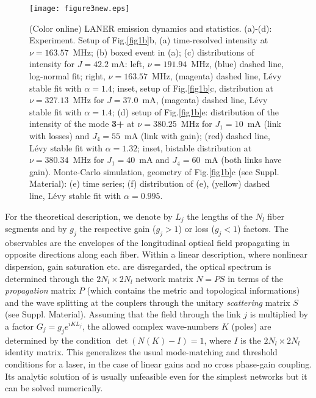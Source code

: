 \documentclass[aps,prl,twocolumn,showpacs,amsmath,amssymb,floatfix,superscriptaddress,
]{revtex4-1}
\begin{document}
\begin{figure*}
\texttt{[image: figure3new.eps]}
\caption{(Color online) LANER emission dynamics and statistics.
(a)-(d): Experiment. Setup of Fig.\ref{fig1b}b, (a) time-resolved intensity at $\nu=163.57$~MHz; (b) boxed event in (a); (c) distributions of intensity for $J=42.2$ mA: left, $\nu=191.94$~MHz, (blue) dashed line, log-normal fit; right, $\nu=163.57$~MHz, (magenta) dashed line, L\'evy stable fit with $\alpha=1.4$; inset, setup of Fig.\ref{fig1b}c, distribution at $\nu=327.13$~MHz for $J=37.0$~mA, (magenta) dashed line, L\'evy stable fit with $\alpha=1.4$; 
(d) setup of Fig.\ref{fig1b}e: distribution of the intensity of the mode {\bf 3+} at $\nu=380.25$~MHz for $J_1=10$~mA (link with losses) and $J_4=55$~mA (link with gain); (red) dashed line, L\'evy stable fit with $\alpha=1.32$; inset, bistable distribution at $\nu=380.34$~MHz for $J_1=40$~mA and $J_4=60$~mA (both links have gain). Monte-Carlo simulation, geometry of Fig.\ref{fig1b}c (see Suppl. Material): (e) time series; (f) distribution of (e), (yellow) dashed line, L\'evy stable fit with $\alpha=0.995$.
}
\label{fig3}
\end{figure*}

For the theoretical description, we denote by $L_j$ the lengths of the $N_l$
fiber segments and by $g_j$ the respective gain ($g_j>1$) or loss ($g_j<1$) factors.
The observables are the envelopes of the longitudinal optical field propagating in opposite directions along each fiber.
Within a linear description, where nonlinear dispersion, gain 
saturation etc. are disregarded, the optical spectrum is determined through the $2N_l\times 2N_l$ network matrix $N=PS$ in terms of the {\it propagation} matrix $P$ (which contains the metric and topological informations) and the wave splitting at the couplers through the unitary {\it scattering} matrix $S$ (see Suppl. Material). Assuming that the field through the link $j$ is multiplied by a factor $G_j 
= g_j e^{i K L_j}$, the allowed complex wave-numbers $K$ (poles) are determined by 
the condition
$\det\left(N(K)-I\right) = 1$,
where $I$ is the $2N_l\times 2N_l$ identity matrix. 
This generalizes the usual mode-matching and threshold conditions for a laser, in the case of linear gains and no cross phase-gain coupling. Its analytic solution of is usually unfeasible even for the 
simplest networks but it can be solved numerically.  
\end{document}
